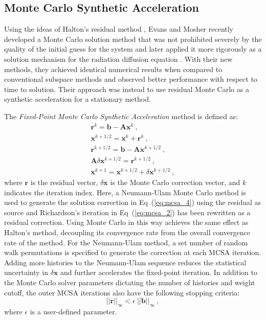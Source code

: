 \documentclass{snamc2013}
\begin{document}
\subsection{Monte Carlo Synthetic Acceleration}
Using the ideas of Halton's residual method
\cite{halton_sequential_1994}, Evans and Mosher recently developed a
Monte Carlo solution method that was not prohibited severely by the
quality of the initial guess for the system \cite{evans_monte_2009}
and later applied it more rigorously as a solution mechanism for the
radiation diffusion equation \cite{evans_monte_2012}. With their new
methods, they achieved identical numerical results when compared to
conventional subspace methods and observed better performance with
respect to time to solution. Their approach was instead to use
residual Monte Carlo as a synthetic acceleration for a stationary
method.

The \textit{Fixed-Point Monte Carlo Synthetic Acceleration} method is
defined as:
\begin{subequations}
  \begin{gather}
    \label{eq:mcsa_1}
    \mathbf{r}^{k} = \mathbf{b} - \mathbf{A}\mathbf{x}^{k}\:,\\
    \label{eq:mcsa_2}
    \mathbf{x}^{k+1/2} = \mathbf{x}^k + \mathbf{r}^k\:,\\
    \label{eq:mcsa_3}
    \mathbf{r}^{k+1/2} = \mathbf{b} - \mathbf{A}\mathbf{x}^{k+1/2}\:,\\
    \label{eq:mcsa_4}
    \mathbf{A}\delta\mathbf{x}^{k+1/2} = \mathbf{r}^{k+1/2}\:,\\
    \label{eq:mcsa_5}
    \mathbf{x}^{k+1} = \mathbf{x}^{k+1/2} + \delta \mathbf{x}^{k+1/2}\:,
  \end{gather}
  \label{eq:mcsa}
\end{subequations}
where $\mathbf{r}$ is the residual vector, $\delta\mathbf{x}$ is the
Monte Carlo correction vector, and $k$ indicates the iteration
index. Here, a Neumann-Ulam Monte Carlo method is used to generate the
solution correction in Eq~(\ref{eq:mcsa_4}) using the residual as
source and Richardson's iteration in Eq~(\ref{eq:mcsa_2}) has been
rewritten as a residual correction. Using Monte Carlo in this way
achieves the same effect as Halton's method, decoupling its
convergence rate from the overall convergence rate of the method. For
the Neumann-Ulam method, a set number of random walk permutations is
specified to generate the correction at each MCSA iteration. Adding
more histories to the Neumann-Ulam sequence reduces the statistical
uncertainty in $\delta\mathbf{x}$ and further accelerates the
fixed-point iteration. In addition to the Monte Carlo solver
parameters dictating the number of histories and weight cutoff, the
outer MCSA iterations also have the following stopping criteria:
\begin{equation}
  ||\mathbf{r}||_\infty < \epsilon \ ||\mathbf{b}||_\infty\:,
  \label{eq:mcsa_stopping_criteria}
\end{equation}
where $\epsilon$ is a user-defined parameter. 
\end{document}
